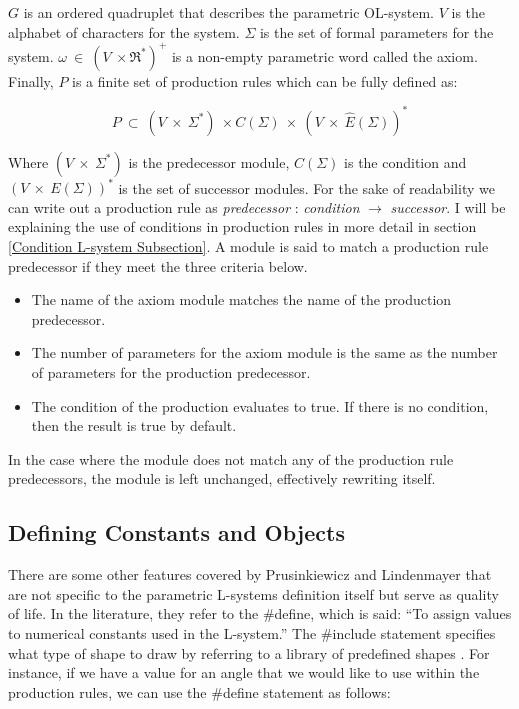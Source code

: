 \noindent
$G$ is an ordered quadruplet that describes the parametric OL-system. $V$ is the alphabet of characters for the system. $\Sigma$ is the set of formal parameters for the system. $\omega~ \in~ (V~ \times \Re^*)^+$ is a non-empty parametric word called the axiom. Finally, $P$ is a finite set of production rules which can be fully defined as:

\begin{equation}
P~ \subset~ (V~ \times~ \Sigma^*)~ \times C(\Sigma)~ \times~ (V~ \times~ \hat{E}(\Sigma))^*
\end{equation}

\noindent
Where $(V~ \times~ \Sigma^*) $ is the predecessor module, $C(\Sigma) $ is the condition and $(V~ \times~ E(\Sigma))^* $ is the set of successor modules. For the sake of readability we can write out a production rule as \textit{predecessor} : \textit{condition} $\rightarrow$ \textit{successor}. I will be explaining the use of conditions in production rules in more detail in section \ref{Condition L-system Subsection}.
A module is said to match a production rule predecessor if they meet the three criteria below.

\begin{itemize}
\item The name of the axiom module matches the name of the production predecessor.
\item The number of parameters for the axiom module is the same as the number of parameters for the production predecessor.
\item The condition of the production evaluates to true. If there is no condition, then the result is true by default.
\end{itemize}

\noindent
In the case where the module does not match any of the production rule predecessors, the module is left unchanged, effectively rewriting itself. 

\subsection{Defining Constants and Objects}

There are some other features covered by Prusinkiewicz and Lindenmayer that are not specific to the parametric L-systems definition itself but serve as quality of life. In the literature, they refer to the \#define, which is said: ``To assign values to numerical constants used in the L-system.'' The \#include statement specifies what type of shape to draw by referring to a library of predefined shapes \cite{prusinkiewicz2012algorithmic}.
\noindent
For instance, if we have a value for an angle that we would like to use within the production rules, we can use the \#define statement as follows:


